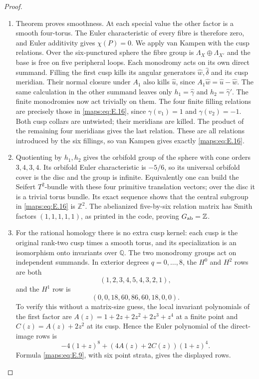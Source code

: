 \begin{proof}
\begin{enumerate}[label={$\langle1\rangle$\arabic*.},leftmargin=*]
\item Theorem  proves smoothness.  At each special value the other
factor is a smooth four-torus.  The Euler characteristic of every
fibre is therefore zero, and Euler additivity gives $\chi(P)=0$.
We apply van Kampen with the cusp relations.
Over the six-punctured sphere the fibre group is
$\Lambda_X\oplus\Lambda_{X'}$ and the base is free on five
peripheral loops.  Each monodromy acts on its own direct summand.
Filling the first cusp kills its angular generators
$\widehat w,\widehat\delta$ and its cusp meridian.  Their normal
closure under $A_1$ also kills $\widehat u$, since
$A_1\widehat w=\widehat u-\widehat w$.  The same calculation
in the other summand leaves only $h_1=\widehat\gamma$ and
$h_2=\widehat\gamma'$.  The finite monodromies now act trivially
on them.  The four finite filling relations are precisely those
in \eqref{maps:eq:E.16}, since $\gamma(v_1)=1$ and $\gamma(v_2)=-1$.
Both cusp collars are untwisted; their meridians are killed.
The product of the remaining four meridians gives the last
relation.  These are all relations introduced by the six
fillings, so van Kampen gives exactly \eqref{maps:eq:E.16}.

\item Quotienting by $h_1,h_2$ gives the orbifold group of the sphere
with cone orders $3,4,3,4$.  Its orbifold Euler characteristic
is $-5/6$, so its universal orbifold cover is the disc and the
group is infinite.  Equivalently one can build the Seifert
$T^2$-bundle with these four primitive translation vectors; over
the disc it is a trivial torus bundle.  Its exact sequence shows
that the central subgroup in \eqref{maps:eq:E.16} is $\mathbb Z^2$.
The abelianized five-by-six relation matrix has Smith factors
$(1,1,1,1,1)$, as printed in the code, proving $G_{\rm ab}=\mathbb Z$.

\item For the rational homology there is no extra cusp kernel: each
cusp is the original rank-two cusp times a smooth torus, and its
specialization is an isomorphism onto invariants over $\mathbb Q$.
The two monodromy groups act on independent summands.  In exterior
degrees $q=0,\ldots,8$, the $H^0$ and $H^2$ rows are both
\[
 (1,2,3,4,5,4,3,2,1),
\]
and the $H^1$ row is
\[
 (0,0,18,60,86,60,18,0,0).
\]
To verify this without a matrix-size guess, the local invariant
polynomials of the first factor are
$A(z)=1+2z+2z^2+2z^3+z^4$ at a finite point and
$C(z)=A(z)+2z^2$ at its cusp.  Hence the Euler polynomial of
the direct-image rows is
\[
 -4(1+z)^8+(4A(z)+2C(z))(1+z)^4.
\]
Formula \eqref{maps:eq:E.9}, with six point strata, gives the displayed rows.


\end{enumerate}
\end{proof}
